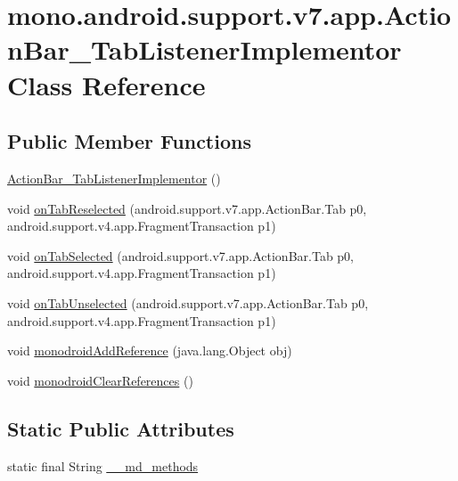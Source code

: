 \hypertarget{classmono_1_1android_1_1support_1_1v7_1_1app_1_1_action_bar___tab_listener_implementor}{
\section{mono.android.support.v7.app.ActionBar\_\-TabListenerImplementor Class Reference}
\label{classmono_1_1android_1_1support_1_1v7_1_1app_1_1_action_bar___tab_listener_implementor}
}
\subsection*{Public Member Functions}
\begin{CompactItemize}
\item 
\hyperlink{classmono_1_1android_1_1support_1_1v7_1_1app_1_1_action_bar___tab_listener_implementor_b52d61c059527cb7dd18391bd8562e4c}{ActionBar\_\-TabListenerImplementor} ()
\item 
void \hyperlink{classmono_1_1android_1_1support_1_1v7_1_1app_1_1_action_bar___tab_listener_implementor_6b35cb09703a4c23539a8e4396b9c863}{onTabReselected} (android.support.v7.app.ActionBar.Tab p0, android.support.v4.app.FragmentTransaction p1)
\item 
void \hyperlink{classmono_1_1android_1_1support_1_1v7_1_1app_1_1_action_bar___tab_listener_implementor_aff79de08cbe6639362e13d59b7e4e4a}{onTabSelected} (android.support.v7.app.ActionBar.Tab p0, android.support.v4.app.FragmentTransaction p1)
\item 
void \hyperlink{classmono_1_1android_1_1support_1_1v7_1_1app_1_1_action_bar___tab_listener_implementor_f68d830015bf6da6d2dc1ae38e124dd6}{onTabUnselected} (android.support.v7.app.ActionBar.Tab p0, android.support.v4.app.FragmentTransaction p1)
\item 
void \hyperlink{classmono_1_1android_1_1support_1_1v7_1_1app_1_1_action_bar___tab_listener_implementor_f54da88b9fc4e1343976e6e7276ecc49}{monodroidAddReference} (java.lang.Object obj)
\item 
void \hyperlink{classmono_1_1android_1_1support_1_1v7_1_1app_1_1_action_bar___tab_listener_implementor_04a2ade136155c99483da263552b02a5}{monodroidClearReferences} ()
\end{CompactItemize}
\subsection*{Static Public Attributes}
\begin{CompactItemize}
\item 
static final String \hyperlink{classmono_1_1android_1_1support_1_1v7_1_1app_1_1_action_bar___tab_listener_implementor_627fdd5a34632303bbbcda69734cdae1}{\_\-\_\-md\_\-methods}
\end{CompactItemize}
